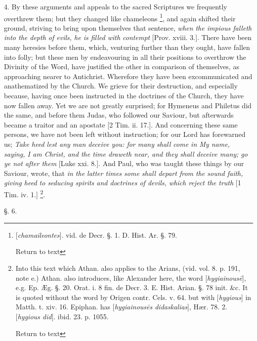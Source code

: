 4. By these arguments and appeals to the sacred
Scriptures we frequently overthrew them; but they changed like
chameleons \footnote{[\emph{chamaileontes}]. vid. de Decr. §. 1. D. Hist. Ar. §. 79.

Return to text}, and again
shifted their ground, striving to bring upon themselves that sentence,
\emph{when the impious falleth into the depth of evils, he is filled with
contempt} [Prov. xviii. 3.]. There have been many heresies before
them, which, venturing further than they ought, have fallen into
folly; but these men by endeavouring in all their positions to
overthrow the Divinity of the Word, have justified the other in
comparison of themselves, as approaching nearer to Antichrist.
Wherefore they have been excommunicated and anathematized by the
Church. We grieve for their destruction, and especially because,
having once been instructed in the doctrines of the Church, they have
now fallen away. Yet we are not greatly surprised; for Hymeneus and
Philetus did the same, and before them Judas, who followed our Saviour,
but afterwards became a traitor and an apostate [2 Tim. ii. 17.]. And
concerning these same persons, we have not been left without
instruction; for our Lord has forewarned us; \emph{Take heed lest any man
deceive you: for many shall come in My name, saying, I am Christ, and
the time draweth near, and they shall deceive many; go ye not after
them} [Luke xxi. 8.]. And Paul, who was taught these things by our
Saviour, wrote, that \emph{in the latter times some shall depart from the
sound faith, giving heed to seducing spirits and doctrines of devils,
which reject the truth} [1 Tim. iv. 1.] \footnote{Into this text which Athan. also applies to the Arians, (vid. vol. 8.
p. 191, note e.) Athan. also introduces, like Alexander here, the word
[\emph{hygiainous\={e}}], e.g. Ep. Æg. §. 20. Orat. i. 8 fin. de
Decr. 3. E. Hist. Arian. §. 78 init. \&c. It is quoted without the
word by Origen contr. Cels. v. 64. but with [\emph{hygious}] in Matth.
t. xiv. 16. Epiphan. has [\emph{hygiainous\={e}s didaskalias}], Hær.
78. 2. [\emph{hygious did}]. ibid. 23. p. 1055.

Return to text}.

§. 6.

